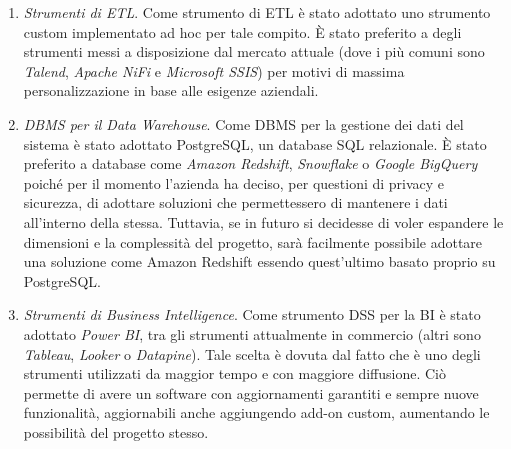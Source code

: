 \begin{enumerate}
    \item \textit{Strumenti di ETL}. Come strumento di ETL è stato adottato uno strumento custom implementato ad hoc per tale compito. È stato preferito a degli strumenti messi a disposizione dal mercato attuale (dove i più comuni sono \textit{Talend}, \textit{Apache NiFi} e \textit{Microsoft SSIS}) per motivi di massima personalizzazione in base alle esigenze aziendali.
    \item \textit{DBMS per il Data Warehouse}. Come DBMS per la gestione dei dati del sistema è stato adottato PostgreSQL, un database SQL relazionale. È stato preferito a database come \textit{Amazon Redshift}, \textit{Snowflake} o \textit{Google BigQuery} poiché per il momento l'azienda ha deciso, per questioni di privacy e sicurezza, di adottare soluzioni che permettessero di mantenere i dati all'interno della stessa. Tuttavia, se in futuro si decidesse di voler espandere le dimensioni e la complessità del progetto, sarà facilmente possibile adottare una soluzione come Amazon Redshift essendo quest'ultimo basato proprio su PostgreSQL.
    \item \textit{Strumenti di Business Intelligence}. Come strumento DSS per la BI è stato adottato \textit{Power BI}, tra gli strumenti attualmente in commercio (altri sono \textit{Tableau}, \textit{Looker} o \textit{Datapine}). Tale scelta è dovuta dal fatto che è uno degli strumenti utilizzati da maggior tempo e con maggiore diffusione. Ciò permette di avere un software con aggiornamenti garantiti e sempre nuove funzionalità, aggiornabili anche aggiungendo add-on custom, aumentando le possibilità del progetto stesso.
\end{enumerate}

